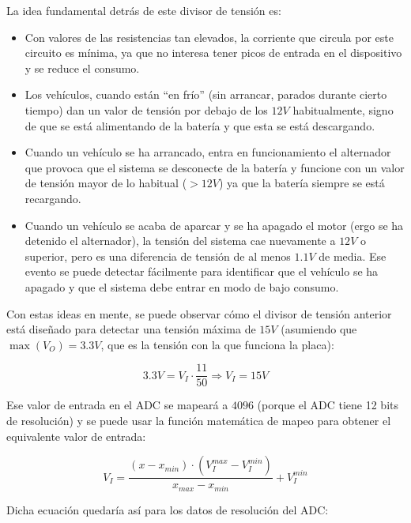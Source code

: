 La idea fundamental detrás de este divisor de tensión es:

\begin{itemize}
  \item Con valores de las resistencias tan elevados, la corriente que circula
        por este circuito es mínima, ya que no interesa tener picos de entrada
        en el dispositivo y se reduce el consumo.
  \item Los vehículos, cuando están ``en frío'' (sin arrancar, parados durante
        cierto tiempo) dan un valor de tensión por debajo de los $12V$ habitualmente,
        signo de que se está alimentando de la batería y que esta se está descargando.
  \item Cuando un vehículo se ha arrancado, entra en funcionamiento el alternador
        que provoca que el sistema se desconecte de la batería y funcione con un
        valor de tensión mayor de lo habitual ($> 12V$) ya que la batería siempre
        se está recargando.
  \item Cuando un vehículo se acaba de aparcar y se ha apagado el motor (ergo se
        ha detenido el alternador), la tensión del sistema cae nuevamente a $12V$
        o superior, pero es una diferencia de tensión de al menos $1.1V$ de media.
        Ese evento se puede detectar fácilmente para identificar que el vehículo se
        ha apagado y que el sistema debe entrar en modo de bajo consumo.
\end{itemize}

Con estas ideas en mente, se puede observar cómo el divisor de tensión anterior está
diseñado para detectar una tensión máxima de $15V$ (asumiendo que $\max\left(V_O\right) = 3.3V$,
que es la tensión con la que funciona la placa):

\begin{equation*}
  3.3V = V_I \cdot \frac{11}{50} \Longrightarrow V_I = 15V
\end{equation*}

Ese valor de entrada en el \ac{ADC} se mapeará a $4096$ (porque el \ac{ADC} tiene
12 bits de resolución) y se puede usar la función matemática de mapeo para obtener
el equivalente valor de entrada:

\begin{equation}\label{eq:map-function}
  V_I = \frac{\left(x - x_{min}\right) \cdot \left(V_I^{max} - V_I^{min}\right)}{x_{max} - x_{min}} + V_I^{min}
\end{equation}

Dicha ecuación quedaría así para los datos de resolución del \ac{ADC}:


